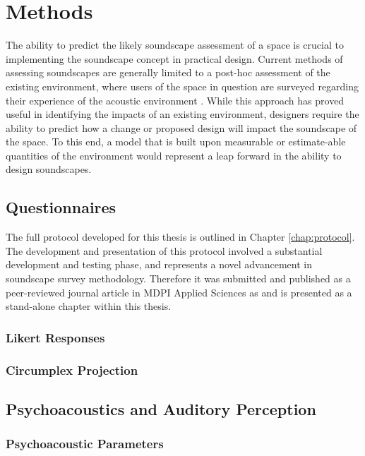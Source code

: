 \chapter{Methods}
\label{chap:methods}

The ability to predict the likely soundscape assessment of a space is crucial to implementing the soundscape concept in practical design. Current methods of assessing soundscapes are generally limited to a post-hoc assessment of the existing environment, where users of the space in question are surveyed regarding their experience of the acoustic environment \citep{Engel2018Review, Zhang2018Effect}. While this approach has proved useful in identifying the impacts of an existing environment, designers require the ability to predict how a change or proposed design will impact the soundscape of the space. To this end, a model that is built upon measurable or estimate-able quantities of the environment would represent a leap forward in the ability to design soundscapes.

\section{Questionnaires}

 The full protocol developed for this thesis is outlined in Chapter \ref{chap:protocol}. The development and presentation of this protocol involved a substantial development and testing phase, and represents a novel advancement in soundscape survey methodology. Therefore it was submitted and published as a peer-reviewed journal article in MDPI Applied Sciences as \citet{Mitchell2020Soundscape} and is presented as a stand-alone chapter within this thesis.

 \subsection{Likert Responses}

 \subsection{Circumplex Projection}

\section{Psychoacoustics and Auditory Perception}

 \subsection{Psychoacoustic Parameters}

